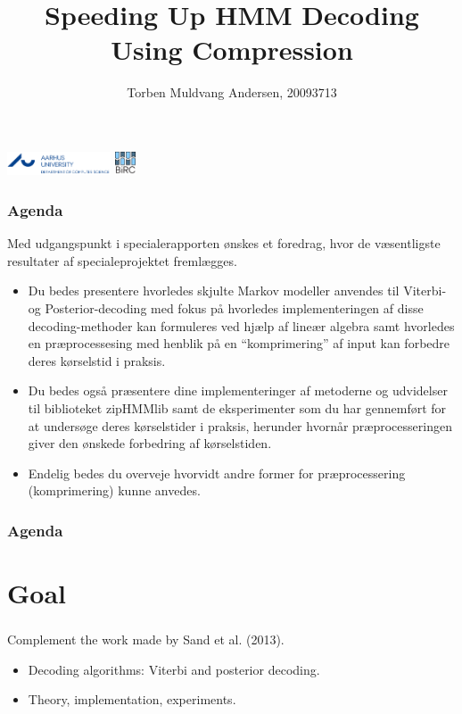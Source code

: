 \documentclass[english,notes]{beamer}
\title{Speeding Up HMM Decoding Using Compression}
\author{Torben Muldvang Andersen, 20093713}
\date{\protect\formatdate{24}{06}{2015}}
\begin{document}
\begin{frame}
  \maketitle
  \includegraphics[height=7mm, trim=0 0 40mm 0, clip]{../logo}
  \hfill
  \includegraphics[height=7mm]{../BiRC-logo}
\end{frame}

\begin{frame}
  \frametitle{Agenda}
    Med udgangspunkt i specialerapporten ønskes et foredrag, hvor de
    væsentligste resultater af specialeprojektet fremlægges.
  \begin{itemize}
  \item Du bedes presentere hvorledes skjulte Markov modeller anvendes til
    Viterbi- og Posterior-decoding med fokus på hvorledes implementeringen af
    disse decoding-methoder kan formuleres ved hjælp af lineær algebra samt
    hvorledes en præprocessesing med henblik på en ``komprimering'' af input
    kan forbedre deres kørselstid i praksis.
  \item Du bedes også præsentere dine implementeringer af metoderne og
    udvidelser til biblioteket zipHMMlib samt de eksperimenter som du har
    gennemført for at undersøge deres kørselstider i praksis, herunder hvornår
    præprocesseringen giver den ønskede forbedring af kørselstiden.
  \item Endelig bedes du overveje hvorvidt andre former for præprocessering
    (komprimering) kunne anvedes.
  \end{itemize}
\end{frame}

\begin{frame}
  \frametitle{Agenda}
  \tableofcontents{}
\end{frame}

\section{Goal}

\begin{frame}
  \frametitle{\insertsection}
  Complement the work made by Sand et al. (2013).
  \begin{itemize}
  \item Decoding algorithms: Viterbi and posterior decoding.
  \item Theory, implementation, experiments.
  \end{itemize}
\end{frame}
\end{document}
